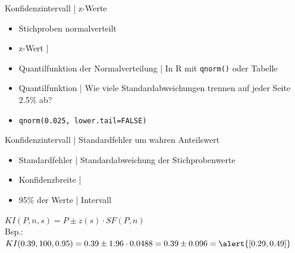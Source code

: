 \begin{frame}
  {Konfidenzintervall | z-Werte}
  \begin{itemize}[<+->]
    \item Stichproben \alert{normalverteilt} 
    \item \alert{z-Wert} | 
      \Zeile
    \item \alert{Quantilfunktion der Normalverteilung} | In R mit \alert{\texttt{qnorm()}} oder \alert{Tabelle}
    \item Quantilfunktion | Wie viele Standardabweichungen trennen auf jeder Seite 2.5\% ab?
    \item \alert{\texttt{qnorm(0.025, lower.tail=FALSE)}}  
  \end{itemize}
\end{frame}

\begin{frame}
  {Konfidenzintervall | Standardfehler um wahren Anteilswert}
  \begin{itemize}[<+->]
    \item Standardfehler | \alert{Standardabweichung} der Stichprobenwerte
    \item \alert{Konfidenzbreite} | 
    \item 95\% der Werte | Intervall 
  \end{itemize}
  \Doppelzeile
  \begin{center}
    \alert{$KI(P,n,s)=P\pm z(s)\cdot SF(P,n)$}\\
    \Zeile
  Bsp.: $KI(0.39,100,0.95)=0.39\pm1.96\cdot 0.0488=0.39\pm0.096=\alert{[0.29, 0.49]}$
  \end{center}
\end{frame}

